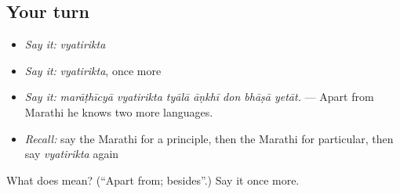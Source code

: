 \subsection*{Your turn}
\begin{itemize}
\raggedright
  \item \emph{Say it:} \emph{vyatirikta}
  \item \emph{Say it:} \emph{vyatirikta}, once more
  \item \emph{Say it:} \emph{marāṭhīcyā vyatirikta tyālā āṇkhī don bhāṣā yetāt.} — Apart from Marathi he knows two more languages.
  \item \emph{Recall:} say the Marathi for a principle, then the Marathi for particular, then say \emph{vyatirikta} again
\end{itemize}

\begin{tcolorbox}[breakable,colback=teal!4,colframe=teal!35!black,title={Before you move on}]
What does  mean? (\textquotedblleft{}Apart from; besides\textquotedblright{}.) Say it once more.
\end{tcolorbox}
